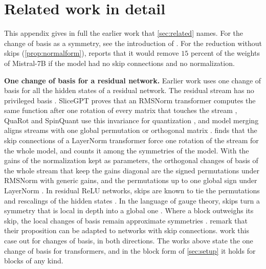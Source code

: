 \documentclass[10pt]{article}
\theoremstyle{definition}
\theoremstyle{remark}
\newcommand{\para}[1]{\smallskip\noindent\textbf{#1}\hspace{0.5em}}
\begin{document}
\section{Related work in detail}\label{app:related}

This appendix gives in full the earlier work that \cref{sec:related} names. For the change of basis as a symmetry, see the introduction of \citet{karbevski2026dimension}. For the reduction without skips (\cref{prop:normalform}), \citet{graef2024tricks} reports that it would remove $15$ percent of the weights of Mistral-7B if the model had no skip connections and no normalization.

\para{One change of basis for a residual network.} Earlier work uses one change of basis for all the hidden states of a residual network. The residual stream has no privileged basis \citep{elhage2021circuits}. SliceGPT proves that an RMSNorm transformer computes the same function after one rotation of every matrix that touches the stream \citep[Theorem~1]{ashkboos2024slicegpt}, QuaRot and SpinQuant use this invariance for quantization \citep{ashkboos2024quarot,liu2024spinquant}, and model merging aligns streams with one global permutation \citep[Section~3.3]{verma2024merging} or orthogonal matrix \citep{theus2025glmc}. \citet{vannierop2024gauge} finds that the skip connections of a LayerNorm transformer force one rotation of the stream for the whole model, and counts it among the symmetries of the model. With the gains of the normalization kept as parameters, the orthogonal changes of basis of the whole stream that keep the gains diagonal are the signed permutations under RMSNorm with generic gains, and the permutations up to one global sign under LayerNorm \citep[Theorem~2.1]{sweeney2026transport}. In residual ReLU networks, skips are known to tie the permutations and rescalings of the hidden states \citep[Remark~3.6]{godfrey2022symmetries}. In the language of gauge theory, skips turn a symmetry that is local in depth into a global one \citep{hashimoto2024unification}. Where a block outweighs its skip, the local changes of basis remain approximate symmetries \citep[Section~6.4]{gong2026aro}. \citet{zhao2023symmetries} remark that their proposition can be adapted to networks with skip connections.  work this case out for changes of basis, in both directions. The works above state the one change of basis for transformers, and in the block form of \cref{sec:setup} it holds for blocks of any kind.
\end{document}
